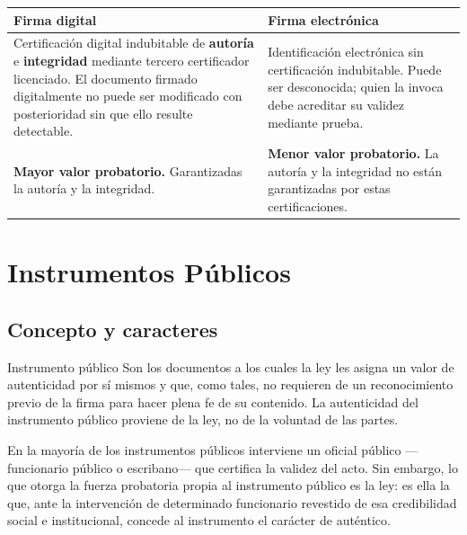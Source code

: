 \documentclass[12pt,oneside]{book}
\begin{document}
\begin{table}[H]
\centering
\begin{tabularx}{\textwidth}{>{\raggedright\arraybackslash}X
                              >{\raggedright\arraybackslash}X}
\toprule
\textbf{Firma digital} & \textbf{Firma electrónica} \\
\midrule
Certificación digital indubitable de \textbf{autoría} e \textbf{integridad} mediante tercero certificador licenciado. El documento firmado digitalmente no puede ser modificado con posterioridad sin que ello resulte detectable. & Identificación electrónica sin certificación indubitable. Puede ser desconocida; quien la invoca debe acreditar su validez mediante prueba. \\[6pt]
\textbf{Mayor valor probatorio.} Garantizadas la autoría y la integridad. & \textbf{Menor valor probatorio.} La autoría y la integridad no están garantizadas por estas certificaciones. \\
\bottomrule
\end{tabularx}
\end{table}

\chapter{Instrumentos Públicos}

\section{Concepto y caracteres}

\begin{definition}{Instrumento público}
Son los documentos a los cuales la ley les asigna un valor de autenticidad por sí mismos y que, como tales, no requieren de un reconocimiento previo de la firma para hacer plena fe de su contenido. La autenticidad del instrumento público proviene de la ley, no de la voluntad de las partes.
\end{definition}

En la mayoría de los instrumentos públicos interviene un oficial público —funcionario público o escribano— que certifica la validez del acto. Sin embargo, lo que otorga la fuerza probatoria propia al instrumento público es la ley: es ella la que, ante la intervención de determinado funcionario revestido de esa credibilidad social e institucional, concede al instrumento el carácter de auténtico.
\end{document}

